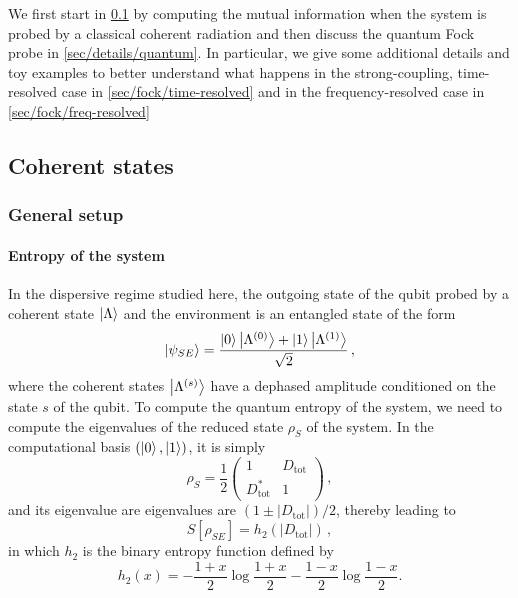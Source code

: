 We first start in \cref{sec/details/classical} by computing the mutual information
when the system is probed by a classical coherent radiation and then 
discuss the quantum Fock probe in
\cref{sec/details/quantum}.
In particular, we give some additional details and toy examples to
better understand what happens in the strong-coupling, time-resolved
case in \cref{sec/fock/time-resolved} and in the frequency-resolved
case in \cref{sec/fock/freq-resolved}


\subsection{Coherent states}
\label{sec/details/classical}

\subsubsection{General setup}

\paragraph*{Entropy of the system}
In the dispersive regime studied here, the outgoing
state of the qubit probed by a coherent state $\ket{\Lambda}$ and 
the environment is an entangled state of the form
%
\begin{equation}
\ket{\psi_{SE}} = \frac{\ket{0}\ket{\Lambda^{(0)}} + 
	\ket{1}\ket{\Lambda^{(1)}}}{\sqrt{2}}\, ,
\end{equation}
where the coherent states $\ket{\Lambda^{(s)}}$ have a dephased
amplitude conditioned on the state $s$ of the qubit. To compute the
quantum entropy of the system, we need to compute the eigenvalues
of the reduced state $\rho_S$ of the system. In the computational 
basis $(\ket{0},\ket{1})$, it is simply
%
\begin{equation}
\rho_S= \frac{1}{2}
\begin{pmatrix}
	1& D_{\text{tot}}  \\
	D_{\text{tot}}^*  & 1 
\end{pmatrix}\, ,
\end{equation}
and its eigenvalue are eigenvalues are $(1 \pm |D_{\text{tot}}|)/2$, thereby
leading to
%
\begin{equation}
	S[\rho_{SE}] = h_2(|D_{\text{tot}}|)
\,,
\end{equation}
in which $h_2$ is the binary entropy function defined by
%
\begin{equation}
	\label{eq/binary-entropy}
h_2(x) = -\frac{1+x}{2} \log\frac{1+x}{2} - \frac{1-x}{2}
	\log\frac{1-x}{2}.
\end{equation}

